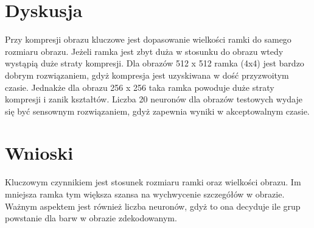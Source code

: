 \documentclass{classrep}
\begin{document}
\section{Dyskusja}
{Przy kompresji obrazu kluczowe jest dopasowanie wielkości ramki do samego rozmiaru obrazu. Jeżeli ramka jest zbyt duża w stosunku do obrazu wtedy wystąpią duże straty kompresji. Dla obrazów 512 x 512 ramka (4x4) jest bardzo dobrym rozwiązaniem, gdyż kompresja jest uzyskiwana w dość przyzwoitym czasie. Jednakże dla obrazu 256 x 256 taka ramka powoduje duże straty kompresji i zanik kształtów. Liczba 20 neuronów dla obrazów testowych wydaje się być sensownym rozwiązaniem, gdyż zapewnia wyniki w akceptowalnym czasie.}
\section{Wnioski}
{Kluczowym czynnikiem jest stosunek rozmiaru ramki oraz wielkości obrazu. Im mniejsza ramka tym większa szansa na wychwycenie szczegółów w obrazie. Ważnym aspektem jest również liczba neuronów, gdyż to ona decyduje ile grup powstanie dla barw w obrazie zdekodowanym.}
\end{document}
